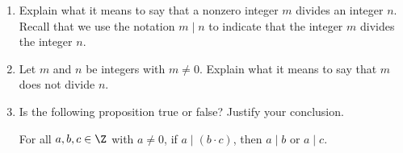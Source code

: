 \begin{previewactivity} \label{PA:reviewdivides} \hfill
\begin{enumerate}
\item Explain what it means to say that a nonzero integer  $m$  divides an integer $n$.  Recall that we use the notation  $m \mid n$  to indicate that the integer  $m$  divides the integer  $n$.


\item Let  $m$  and  $n$  be integers with $m \ne 0$.  Explain what it means to say that  $m$  does not divide  $n$.

%

\item Is the following proposition true or false?  Justify your conclusion.
\begin{center}
For all  $a, b, c \in \Z$ with $a \ne 0$, if  $a \mid \left( {b \cdot c} \right)$, then  $a \mid b$
or  $a \mid c$.
\end{center}
\end{enumerate}
\end{previewactivity}
\hbreak
%
